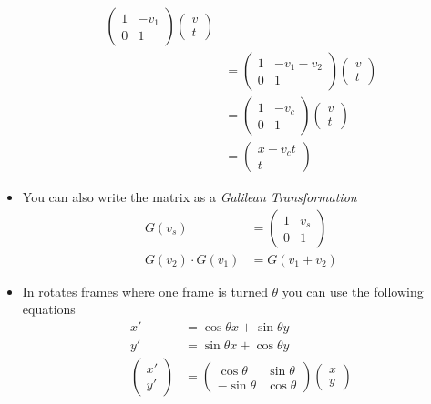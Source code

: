 \documentclass[12pt,letterpaper, twocolumn]{article}
\begin{document}
\begin{itemize}
\begin{align*}
        \begin{pmatrix}
            1&-v_1\\0&1
        \end{pmatrix}
        \begin{pmatrix}
            v\\t
        \end{pmatrix}
        \\
        &=\begin{pmatrix}
            1&-v_1-v_2\\0&1
        \end{pmatrix}\begin{pmatrix}
            v\\t
        \end{pmatrix}\\
        &= \begin{pmatrix}
            1&-v_c\\0&1
        \end{pmatrix}\begin{pmatrix}
            v\\t
        \end{pmatrix}\\
        &= \begin{pmatrix}
            x-v_c t\\t
        \end{pmatrix}
    \end {align*}
      \item You can also write the matrix as a \textit{Galilean Transformation}
      \begin{align*}
        G(v_s) &= \begin{pmatrix}
            1&v_s\\0&1
        \end{pmatrix}\\
        G(v_2) \cdot G(v_1) &= G(v_1+v_2)
      \end{align*}
      \item In rotates frames where one frame is turned $\theta$ you can use the following equations
      \begin{align*}
        x' &=\cos\theta x + \sin\theta y\\
        y' &=\sin\theta x + \cos\theta y\\
        \begin{pmatrix}x'\\y'\end{pmatrix} &= \begin{pmatrix}\cos\theta&\sin\theta\\-\sin\theta&\cos\theta\end{pmatrix}\begin{pmatrix}x\\y\end{pmatrix}\\

\end{align*}
\end{itemize}
\end{document}
